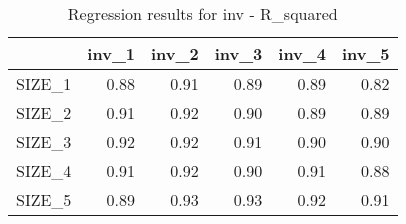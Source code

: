 \begin{table}[ht]
\centering
\caption{Regression results for inv - R_squared} 
\begin{tabular}{rrrrrr}
  \hline
 & inv\_1 & inv\_2 & inv\_3 & inv\_4 & inv\_5 \\ 
  \hline
SIZE\_1 & 0.88 & 0.91 & 0.89 & 0.89 & 0.82 \\ 
  SIZE\_2 & 0.91 & 0.92 & 0.90 & 0.89 & 0.89 \\ 
  SIZE\_3 & 0.92 & 0.92 & 0.91 & 0.90 & 0.90 \\ 
  SIZE\_4 & 0.91 & 0.92 & 0.90 & 0.91 & 0.88 \\ 
  SIZE\_5 & 0.89 & 0.93 & 0.93 & 0.92 & 0.91 \\ 
   \hline
\end{tabular}
\end{table}


